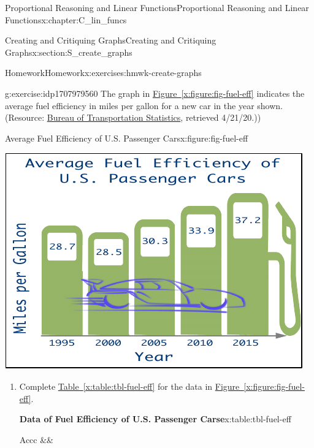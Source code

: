 \documentclass[oneside,10pt,]{book}
\newcommand{\tabularfont}{\relax}
\newcommand{\xreffont}{\relax}
\numberwithin{equation}{chapter}
\newcommand{\hrulethin}  {\noalign{\hrule height 0.04em}}
\begin{document}
\begin{chapterptx}{Proportional Reasoning and Linear Functions}{}{Proportional Reasoning and Linear Functions}{}{}{x:chapter:C_lin_funcs}
\begin{sectionptx}{Creating and Critiquing Graphs}{}{Creating and Critiquing Graphs}{}{}{x:section:S_create_graphs}
\begin{exercises-subsection}{Homework}{}{Homework}{}{}{x:exercises:hmwk-create-graphs}
%
\begin{divisionexercise}{4}{}{}{g:exercise:idp1707979560}%
The graph in \hyperref[x:figure:fig-fuel-eff]{Figure~{\xreffont\ref{x:figure:fig-fuel-eff}}} indicates the average fuel efficiency in miles per gallon for a new car in the year shown. (Resource: \href{https://www.bts.gov/content/average-fuel-efficiency-us-passenger-cars-and-light-trucks}{Bureau of Transportation Statistics}\footnotemark{}, retrieved 4\slash{}21\slash{}20.))%
\begin{figureptx}{Average Fuel Efficiency of U.S. Passenger Cars}{x:figure:fig-fuel-eff}{}%
\begin{image}{0.15}{0.7}{0.15}%
\includegraphics[width=\linewidth]{external/fuel-eff.pdf}
\end{image}%
\tcblower
\end{figureptx}%
\begin{enumerate}[font=\bfseries,label=(\alph*),ref=\alph*]
\item\label{x:task:exer-fuel-a}Complete \hyperref[x:table:tbl-fuel-eff]{Table~{\xreffont\ref{x:table:tbl-fuel-eff}}} for the data in \hyperref[x:figure:fig-fuel-eff]{Figure~{\xreffont\ref{x:figure:fig-fuel-eff}}}.%
\begin{tableptx}{\textbf{Data of Fuel Efficiency of U.S. Passenger Carse}}{x:table:tbl-fuel-eff}{}%
\centering%
{\tabularfont%
\begin{tabular}{Accc}\hrulethin
{}&&\tabularnewline\hrulethin

\end{tabular}}
\end{tableptx}
\end{enumerate}
\end{divisionexercise}
\end{exercises-subsection}
\end{sectionptx}
\end{chapterptx}
\end{document}
